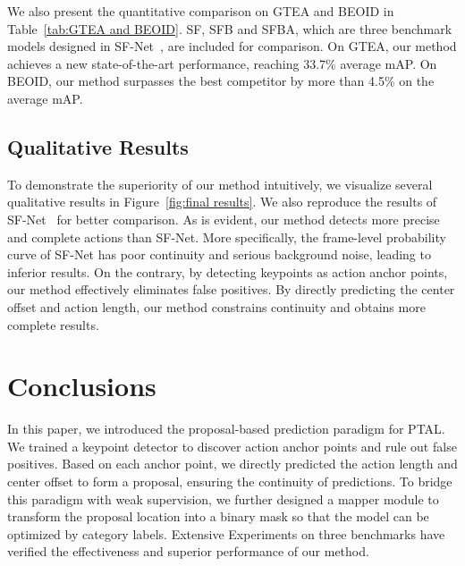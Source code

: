 \documentclass[final]{cvpr}
\begin{document}
We also present the quantitative comparison on GTEA and BEOID in Table~\ref{tab:GTEA and BEOID}.
SF, SFB and SFBA, which are three benchmark models designed in SF-Net~\cite{ma2020sf}, are included for comparison. On GTEA, our method achieves a new state-of-the-art performance, reaching 33.7\% average mAP. On BEOID, our method surpasses the best competitor by more than 4.5\% on the average mAP.







\subsection{Qualitative Results}
To demonstrate the superiority of our method intuitively, we visualize several qualitative results in Figure~\ref{fig:final results}. We also reproduce the results of SF-Net~\cite{ma2020sf} for better comparison.
As is evident, our method detects more precise and complete actions than SF-Net. More specifically, the frame-level probability curve of SF-Net has poor continuity and serious background noise, leading to inferior results. On the contrary, by detecting keypoints as action anchor points, our method effectively eliminates false positives. By directly predicting the center offset and action length, our method constrains continuity and obtains more complete results.








\section{Conclusions}
In this paper, we introduced the proposal-based prediction paradigm for PTAL. We trained a keypoint detector to discover action anchor points and rule out false positives. Based on each anchor point, we directly predicted the action length and center offset to form a proposal, ensuring the continuity of predictions.
To bridge this paradigm with weak supervision, we further designed a mapper module to transform the proposal location into a binary mask so that the model can be optimized by category labels.
Extensive Experiments on three benchmarks have verified the effectiveness and superior performance of our method.






{\small


}
\end{document}

